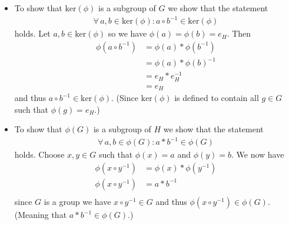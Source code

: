 \documentclass{article}
\begin{document}
\begin{itemize}
    \item To show that $\text{ker}(\phi)$ is a subgroup of $G$ we show that the statement
    \begin{align*}
        \forall\, a, b \in \text{ker}(\phi) :  a \circ b^{-1} \in \text{ker}(\phi)
    \end{align*}
    holds. Let $a, b \in \text{ker}(\phi)$ so we have $\phi(a) = \phi(b) = e_H$. Then
    \begin{align*}
        \phi(a \circ b^{-1}) &= \phi(a) * \phi(b^{-1}) \\
        &= \phi(a) * \phi(b)^{-1} \\
        &= e_H * e_H^{-1} \\
        &= e_H
    \end{align*}
    and thus $a \circ b^{-1} \in \text{ker}(\phi)$. (Since $\text{ker}(\phi)$ is defined to contain all $g \in G$ such that $\phi(g) = e_H$.)

    \item To show that $\phi(G)$ is a subgroup of $H$ we show that the statement
    \begin{align*}
        \forall\, a, b \in \phi(G):  a * b^{-1} \in \phi(G)
    \end{align*}
    holds. Choose $x, y \in G$ such that $\phi(x) = a$ and $\phi(y) = b$. We now have
    \begin{align*}
        \phi(x \circ y^{-1}) &= \phi(x) * \phi(y^{-1}) \\
        \phi(x \circ y^{-1}) &= a * b^{-1} \\
    \end{align*}
    since $G$ is a group we have $x \circ y^{-1} \in G$ and thus $\phi(x \circ y^{-1}) \in \phi(G)$. (Meaning that $a * b^{-1} \in \phi(G)$.)
\end{itemize}
\end{document}
